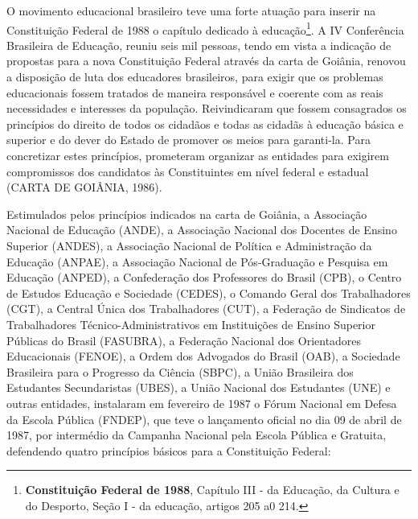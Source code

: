 O movimento educacional brasileiro teve uma forte atuação para inserir
na Constituição Federal de 1988 o capítulo dedicado à educação\footnote{\textbf{Constituição
  Federal de 1988}, Capítulo III - da Educação, da Cultura e do
  Desporto, Seção I
  - da educação, artigos 205 a0 214.}. A IV Conferência Brasileira de
Educação, reuniu seis mil pessoas, tendo em vista a indicação de
propostas para a nova Constituição Federal através da carta de Goiânia,
renovou a disposição de luta dos educadores brasileiros, para exigir que
os problemas educacionais fossem tratados de maneira responsável e
coerente com as reais necessidades e interesses da população.
Reivindicaram que fossem consagrados os princípios do direito de todos
os cidadãos e todas as cidadãs à educação básica e superior e do dever
do Estado de promover os meios para garanti-la. Para concretizar estes
princípios, prometeram organizar as entidades para exigirem compromissos
dos candidatos às Constituintes em nível federal e estadual (CARTA DE
GOIÂNIA, 1986).

Estimulados pelos princípios indicados na carta de Goiânia, a Associação
Nacional de Educação (ANDE), a Associação Nacional dos Docentes de
Ensino Superior (ANDES), a Associação Nacional de Política e
Administração da Educação (ANPAE), a Associação Nacional de
Pós-Graduação e Pesquisa em Educação (ANPED), a Confederação dos
Professores do Brasil (CPB), o Centro de Estudos Educação e Sociedade
(CEDES), o Comando Geral dos Trabalhadores (CGT), a Central Única dos
Trabalhadores (CUT), a Federação de Sindicatos de Trabalhadores
Técnico-Administrativos em Instituições de Ensino Superior Públicas do
Brasil (FASUBRA), a Federação Nacional dos Orientadores Educacionais
(FENOE), a Ordem dos Advogados do Brasil (OAB), a Sociedade Brasileira
para o Progresso da Ciência (SBPC), a União Brasileira dos Estudantes
Secundaristas (UBES), a União Nacional dos Estudantes (UNE) e outras
entidades, instalaram em fevereiro de 1987 o Fórum Nacional em Defesa da
Escola Pública (FNDEP), que teve o lançamento oficial no dia 09 de abril
de 1987, por intermédio da Campanha Nacional pela Escola Pública e
Gratuita, defendendo quatro princípios básicos para a Constituição
Federal:

